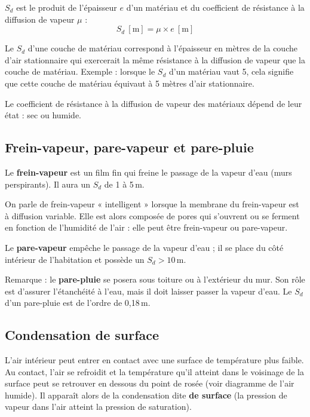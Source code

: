 $S_d$ est le produit de l'épaisseur $e$ d'un matériau et du coefficient de résistance à la diffusion de vapeur $\mu$ :
\begin{equation}
  S_d\ \mathrm{[m]} = \mu \times e\ \mathrm{[m]}
\end{equation}

Le $S_d$ d'une couche de matériau correspond à l'épaisseur en mètres de la couche d'air stationnaire qui exercerait la même résistance à la diffusion de vapeur que la couche de matériau.
Exemple : lorsque le $S_d$ d'un matériau vaut 5, cela signifie que cette couche de matériau équivaut à 5 mètres d'air stationnaire.

Le coefficient de résistance à la diffusion de vapeur des matériaux dépend de leur état : sec ou humide.

\subsection*{Frein-vapeur, pare-vapeur et pare-pluie}
Le \textbf{frein-vapeur} est un film fin qui freine le passage de la vapeur d'eau (murs perspirants). Il aura un $S_d$ de 1 à 5\,m.

On parle de frein-vapeur « intelligent » lorsque la membrane du frein-vapeur est à diffusion variable. Elle est alors composée de pores qui s'ouvrent ou se ferment en fonction de l'humidité de l'air : elle peut être frein-vapeur ou pare-vapeur.

Le \textbf{pare-vapeur} empêche le passage de la vapeur d'eau ; il se place du côté intérieur de l'habitation et possède un $S_d > 10$\,m.

Remarque : le \textbf{pare-pluie} se posera sous toiture ou à l'extérieur du mur. Son rôle est d'assurer l'étanchéité à l'eau, mais il doit laisser passer la vapeur d'eau.
Le $S_d$ d'un pare-pluie est de l'ordre de 0,18\,m.

\subsection*{Condensation de surface}
L'air intérieur peut entrer en contact avec une surface de température plus faible. Au contact, l'air se refroidit et la température qu'il atteint dans le voisinage de la surface peut se retrouver en dessous du point de rosée (voir diagramme de l'air humide).
Il apparaît alors de la condensation dite \textbf{de surface} (la pression de vapeur dans l'air atteint la pression de saturation).

